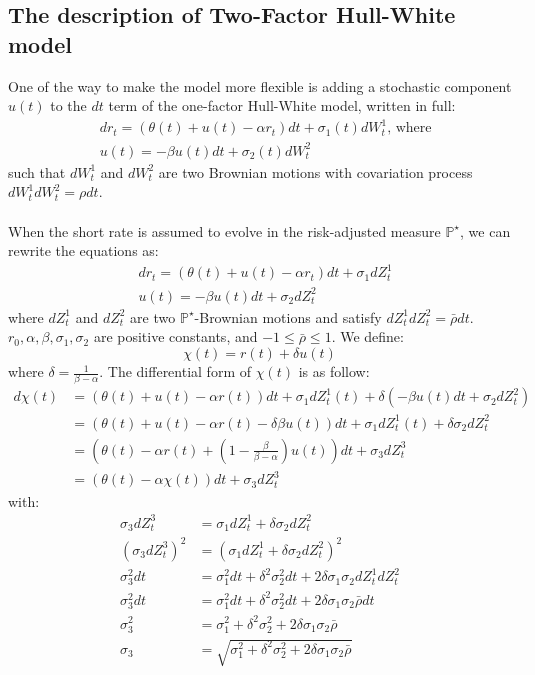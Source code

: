 \documentclass{article}
\begin{document}
\subsection{The description of Two-Factor Hull-White model
}
One of the way to make the model more flexible is adding a stochastic component $u(t)$ to the $dt$ term of the one-factor Hull-White model, written in full:
\begin{align*}
& dr_t = (\theta(t) + u(t) - \alpha r_t)dt + \sigma_{1}(t)dW_{t}^{1} \text{, where} \\
& u(t) = -\beta u(t)dt + \sigma_{2}(t)dW_{t}^{2}
\end{align*}
such that $dW_{t}^{1}$ and $dW_{t}^{2}$ are two Brownian motions with covariation process $dW_{t}^{1}dW_{t}^{2} = \rho dt$. \\
\\
When the short rate is assumed to evolve in the risk-adjusted measure $\mathbb{P}^{\star}$, we can rewrite the equations as:
\begin{align*}
& dr_t = (\theta(t) + u(t) - \alpha r_t)dt + \sigma_{1}dZ_{t}^{1}  \\
& u(t) = -\beta u(t)dt + \sigma_{2}dZ_{t}^{2}
\end{align*}
where $dZ_{t}^{1}$ and $dZ_{t}^{2}$ are two $\mathbb{P}^{\star}$-Brownian motions and satisfy $dZ_{t}^{1}dZ_{t}^{2} = \bar{\rho} dt$.
$r_{0}, \alpha, \beta, \sigma_{1}, \sigma_{2}$ are positive constants, and $-1 \le \bar{\rho} \le 1$. We define:
\[
\chi (t) = r(t) + \delta u(t)
\]
where $\delta = \frac{1}{\beta - \alpha}$. The differential form of $\chi (t)$ is as follow:
\begin{align*}
d\chi(t) &= (\theta(t) + u(t) - \alpha r(t))dt + \sigma_{1}dZ_{t}^{1}(t) + \delta (-\beta u(t)dt + \sigma_{2}dZ_{t}^{2}) \\
&= (\theta(t) + u(t) - \alpha r(t) - \delta \beta u(t))dt + \sigma_{1}dZ_{t}^{1}(t) + \delta \sigma_{2}dZ_{t}^{2} \\
&= \left(\theta(t) - \alpha r(t) + \left(1 - \frac{\beta}{\beta - \alpha} \right)u(t) \right)dt + \sigma_{3}dZ_{t}^{3} \\
&= (\theta(t) - \alpha \chi(t) )dt + \sigma_{3}dZ_{t}^{3}
\end{align*}
with:
\begin{align*}
\sigma_{3}dZ_{t}^{3} &= \sigma_{1}dZ_{t}^{1} + \delta\sigma_{2}dZ_{t}^{2} \\
(\sigma_{3}dZ_{t}^{3})^{2} &= (\sigma_{1}dZ_{t}^{1} + \delta\sigma_{2}dZ_{t}^{2})^{2} \\
\sigma_{3}^{2}dt &= \sigma_{1}^{2}dt + \delta^{2}\sigma_{2}^{2}dt + 2\delta\sigma_{1}\sigma_{2}dZ_{t}^{1}dZ_{t}^{2} \\
\sigma_{3}^{2}dt  &=  \sigma_{1}^{2}dt + \delta^{2}\sigma_{2}^{2}dt + 2\delta\sigma_{1}\sigma_{2}\bar{\rho} dt \\
\sigma_{3}^{2}  &= \sigma_{1}^{2} + \delta^{2}\sigma_{2}^{2} + 2\delta\sigma_{1}\sigma_{2}\bar{\rho} \\
\sigma_{3}  &= \sqrt{\sigma_{1}^{2} + \delta^{2}\sigma_{2}^{2} + 2\delta\sigma_{1}\sigma_{2}\bar{\rho}} \\
\end{align*}
\end{document}
